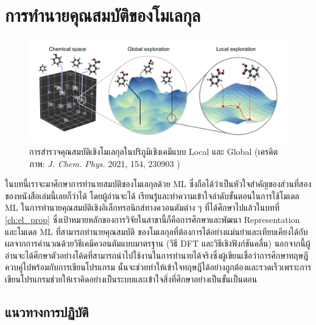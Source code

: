 

\chapter{การทำนายคุณสมบัติของโมเลกุล}
\label{ch:predict_molprop}

\begin{figure}[htbp]
    \centering
    \includegraphics[width=\linewidth]{fig/ml_pred_chem.png}
    \caption{การสำรวจคุณสมบัติเชิงโมเลกุลในปริภูมิเชิงเคมีแบบ Local และ Global 
    (เครดิตภาพ: \textit{J. Chem. Phys.} 2021, 154, 230903 \autocite{westermayr2021b})}
    \label{fig:ml_pred_chem}
\end{figure}

ในบทนี้เราจะมาศึกษาการทำนายสมบัติของโมเลกุลด้วย ML ซึ่งถือได้ว่าเป็นหัวใจสำคัญของส่วนที่สองของหนังสือเล่มนี้เลยก็ว่าได้ โดยผู้อ่านจะได้%
เรียนรู้และทำความเข้าใจลำดับขั้นตอนในการใช้โมเดล ML ในการทำนายคุณสมบัติเชิงอิเล็กทรอนิกส์ทางควอนตัมต่าง ๆ ที่ได้ศึกษาไปแล้วในบทที่ 
\ref{ch:el_prop} ซึ่งเป้าหมายหลักของการวิจัยในสาขานี้ก็คือการศึกษาและพัฒนา Representation และโมเดล ML ที่สามารถทำนายคุณสมบัติ%
ของโมเลกุลที่ต้องการได้อย่างแม่นยำและเทียบเคียงได้กับผลจากการคำนวณด้วยวิธีเคมีควอนตัมแบบมาตรฐาน (วิธี DFT และวิธีเชิงฟังก์ชันคลื่น) 
นอกจากนี้ผู้อ่านจะได้ศึกษาตัวอย่างโค้ดที่สามารถนำไปใช้งานในการทำนายได้จริงซึ่งผู้เขียนเชื่อว่าการศึกษาทฤษฎีควบคู่ไปพร้อมกับการเขียนโปรแกรม%
นั้นจะช่วยทำให้เข้าใจทฤษฎีได้อย่างถูกต้องและรวดเร็วเพราะการเขียนโปรแกรมช่วยให้เราคิดอย่างเป็นระบบและเข้าใจสิ่งที่ศึกษาอย่างเป็นขั้นเป็นตอน

\section{แนวทางการปฏิบัติ}
\label{sec:pred_best_prac}

